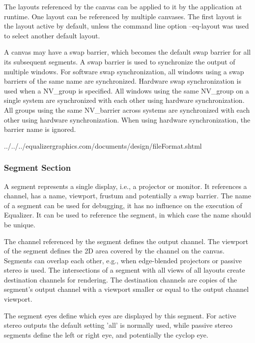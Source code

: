 \documentclass[10pt,a4]{scrartcl}
\begin{document}
The layouts referenced by the canvas can be applied to it by the application at
runtime. One layout can be referenced by multiple canvases. The first layout is
the layout active by default, unless the command line option
\textsf{--eq-layout} was used to select another default layout.

A canvas may have a swap barrier, which becomes the default swap barrier for all
its subsequent segments. A swap barrier is used to synchronize the output of
multiple windows. For software swap synchronization, all windows using a swap
barriers of the same name are synchronized. Hardware swap synchronization is
used when a \textsf{NV\_group} is specified. All windows using the same
\textsf{NV\_group} on a single system are synchronized with each other using
hardware synchronization. All groups using the same \textsf{NV\_barrier} across
systems are synchronized with each other using hardware synchronization. When
using hardware synchronization, the barrier name is ignored.

{\footnotesize
  {../../../equalizergraphics.com/documents/design/fileFormat.shtml}}

\subsubsection{Segment Section}

A segment represents a single display, i.e., a projector or monitor. It
references a channel, has a name, viewport, frustum and potentially a swap
barrier. The name of a segment can be used for debugging, it has no influence on
the execution of Equalizer. It can be used to reference the segment, in which
case the name should be unique.

The channel referenced by the segment defines the output channel. The viewport
of the segment defines the 2D area covered by the channel on the
canvas. Segments can overlap each other, e.g., when edge-blended projectors or
passive stereo is used. The intersections of a segment with all views of all
layouts create destination channels for rendering. The destination channels are
copies of the segment's output channel with a viewport smaller or equal to the
output channel viewport.

The segment eyes define which eyes are displayed by this segment. For active
stereo outputs the default setting 'all' is normally used, while passive stereo
segments define the left or right eye, and potentially the cyclop eye.
\end{document}
